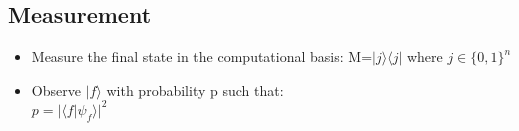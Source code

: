 \documentclass{article}
\begin{document}
\subsection{Measurement}

\begin{itemize}
    \item Measure the final state in the computational basis: M={${|j\rangle\langle j|}$ where ${j\in \{0,1\}^n}$}
\end{itemize}
\begin{itemize}
    \item Observe ${|f\rangle}$ with probability p such that: \\
    ${p=|\langle f|\psi_f\rangle|^2}$
\end{itemize}
\end{document}
